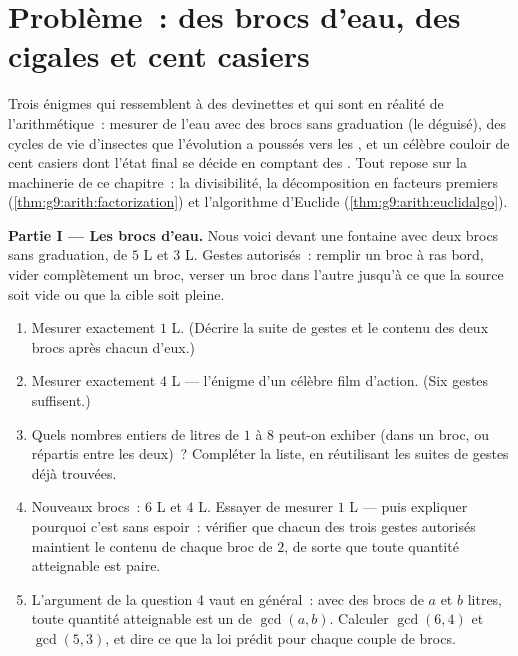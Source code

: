 \section{Problème~: des brocs d'eau, des cigales et cent casiers}

\begin{problem}
\label{pb:g9:arith:1}
Trois énigmes qui ressemblent à des devinettes et qui sont en réalité
de l'arithmétique~: mesurer de l'eau avec des brocs sans graduation
(le  déguisé), des cycles de vie d'insectes que l'évolution a
poussés vers les , et un célèbre couloir de cent
casiers dont l'état final se décide en comptant des . Tout
repose sur la machinerie de ce chapitre~: la divisibilité, la
décomposition en facteurs premiers
(\cref{thm:g9:arith:factorization}) et l'algorithme d'Euclide
(\cref{thm:g9:arith:euclidalgo}).

\medskip
\noindent\textbf{Partie I --- Les brocs d'eau.}
Nous voici devant une fontaine avec deux brocs sans graduation, de
$5$ L et $3$ L. Gestes autorisés~: remplir un broc à ras bord, vider
complètement un broc, verser un broc dans l'autre jusqu'à ce que la
source soit vide ou que la cible soit pleine.
\begin{enumerate}
  \item Mesurer exactement $1$ L. (Décrire la suite de gestes et le
        contenu des deux brocs après chacun d'eux.)
  \item Mesurer exactement $4$ L --- l'énigme d'un célèbre film
        d'action. (Six gestes suffisent.)
  \item Quels nombres entiers de litres de $1$ à $8$ peut-on
        exhiber (dans un broc, ou répartis entre les deux)~?
        Compléter la liste, en réutilisant les suites de gestes déjà
        trouvées.
  \item Nouveaux brocs~: $6$ L et $4$ L. Essayer de mesurer $1$ L
        --- puis expliquer pourquoi c'est sans espoir~: vérifier que
        chacun des trois gestes autorisés maintient le contenu de
        chaque broc  de $2$, de sorte que toute quantité
        atteignable est paire.
  \item L'argument de la question 4 vaut en général~: avec des brocs
        de $a$ et $b$ litres, toute quantité atteignable est un
         de $\gcd(a, b)$. Calculer $\gcd(6, 4)$ et
        $\gcd(5, 3)$, et dire ce que la loi prédit pour chaque
        couple de brocs.
\end{enumerate}


\end{problem}
